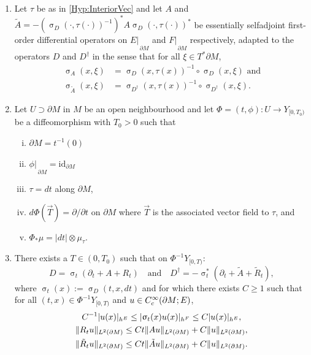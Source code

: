 \documentclass[a4paper,10pt,reqno]{amsart}
\newcommand{\sym}{\upsigma}
\newcommand{\rest}[1]{{{\lvert_{}}_{}}_{#1}}
\newcommand{\id}{\mathrm{id}}
\newcommand{\modulus}[1]{|#1|}
\newcommand{\norm}[1]{\| #1 \|}%
\newcommand{\Lp}[2][{}]{{\rm L}^{#2}_{\rm #1}}%
\newcommand{\Ck}[2][{}]{{\rm C}^{#2}_{\rm #1}}%
\newcommand{\dM}{\partial M}
\theoremstyle{definition}
\begin{document}
\begin{enumerate}[label=(G\arabic*), labelwidth=0pt, labelindent=2pt, leftmargin=26pt]
\label{ExtSetup}

\item \label{Hyp:ExtFirst}
      Let $\tau$ be as in \ref{Hyp:InteriorVec} and let $A$ and $\tilde{A} = -(\sym_{D}(\cdot,\tau(\cdot))^{-1})^\ast A \sym_{D}(\cdot,\tau(\cdot))^\ast$ be essentially selfadjoint first-order differential operators on  $E\rest{\partial M}$ and $F\rest{\partial M}$  respectively, adapted to the operators $D$ and $D^\dagger$ in the sense that for all $\xi \in T^*\dM$, 
      \begin{align*}
      \sym_{A}(x,\xi)         & = \sym_{D}(x,\tau(x))^{-1} \circ \sym_{D}(x,\xi) \text{ and}      \\
      \sym_{\tilde{A}}(x,\xi) & = \sym_{D^\dagger}(x,\tau(x))^{-1} \circ \sym_{D^\dagger}(x,\xi).
      \end{align*}

\item  \label{Hyp:Metric}
      Let $U \supset \dM$ in $M$ be an open neighbourhood and let $\Phi = (t, \phi)\colon U \to Y_{[0,T_0)}$ be a diffeomorphism with $T_0 > 0$ such that
      \begin{enumerate}[(i)]
      \item $\dM = t^{-1}(0)$
      \item $\phi\rest{\dM} = \id_{\dM}$
      \item $\tau = dt$ along $\dM$,
      \item $d\Phi(\vec{T}) = \partial/\partial t$ on $\dM$ where $\vec{T}$ is the associated vector field to $\tau$, and
      \item $\Phi_{\ast} \mu = \modulus{dt} \otimes \mu_{\tau}$.
      \end{enumerate}

\item \label{Hyp:RemControl}
      \label{Hyp:ExtLast}
      There exists a $T \in (0, T_{0})$ such that on $\Phi^{-1} Y_{[0,T)}$:
      $$D = \sym_t(\partial_t + A + R_t)\quad\text{and}\quad D^\dagger = - \sym_t^\ast(\partial_t + \tilde{A} + \tilde{R}_t),$$
      where $\sym_t(x) := \sym_{D}(t,x,dt)$ and for which there exists $C \geq 1$ such that for all $(t,x) \in \Phi^{-1} Y_{[0,T)}$ and $u\in\Ck[c]{\infty}(\dM;E)$,
      \begin{gather*}
      C^{-1}\modulus{u(x)}_{h^E} \leq \modulus{\sym_t(x)u(x)}_{h^F} \leq C \modulus{u(x)}_{h^E}, \\
      \norm{R_t u}_{\Lp{2}(\dM)} \leq C t  \norm{A u}_{\Lp{2}(\dM)} + C\norm{ u}_{\Lp{2}(\dM)}, \\
      \norm{\tilde{R}_t u}_{\Lp{2}(\dM)} \leq  C  t\norm{\tilde{A} u}_{\Lp{2}(\dM)} + C \norm{ u}_{\Lp{2}(\dM)}.
      \end{gather*}
\end{enumerate}
\end{document}
